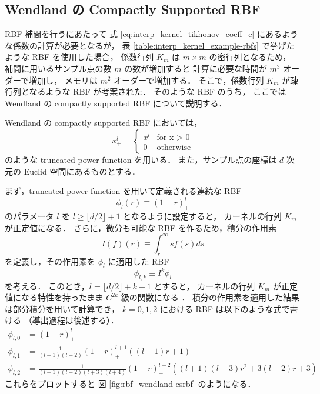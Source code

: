 \subsection{Wendland の Compactly Supported RBF}\label{sec:interp_kernel_csrbf}

RBF 補間を行うにあたって
式 \eqref{eq:interp_kernel_tikhonov_coeff_c} にあるような係数の計算が必要となるが，
表 \ref{table:interp_kernel_example-rbfs}
で挙げたような RBF を使用した場合，
係数行列 $K_m$ は $m \times m$ の密行列となるため，
補間に用いるサンプル点の数 $m$ の数が増加すると
計算に必要な時間が $m^3$ オーダーで増加し，
メモリは $m^2$ オーダーで増加する．
そこで，係数行列 $K_m$ が疎行列となるような RBF が考案された．
そのような RBF のうち，
ここでは Wendland の compactly supported RBF \cite{Wendland1995} について説明する．

Wendland の compactly supported RBF においては，
\begin{equation}
    x_+^l = \begin{cases}
        x^l & \text{for x > 0} \\
        0   & \text{otherwise}
    \end{cases}
\end{equation}
のような truncated power function を用いる．
また，サンプル点の座標は $d$ 次元の Euclid 空間にあるものとする．

まず，truncated power function を用いて定義される連続な RBF
\begin{equation}
    \phi_l(r) \equiv (1 - r)_+^l
\end{equation}
のパラメータ $l$ を $l \ge \lfloor d/2 \rfloor + 1$ となるように設定すると，
カーネルの行列 $K_m$ が正定値になる．
さらに，微分も可能な RBF を作るため，積分の作用素
\begin{equation}
    I(f)(r) \equiv \int_r^\infty sf(s) ds
\end{equation}
を定義し，その作用素を $\phi_l$ に適用した RBF
\begin{equation}
    \phi_{l,k} \equiv I^k \phi_l \label{eq:rbf_wendland-csrbf_definition}
\end{equation}
を考える．
このとき，$l = \lfloor d/2 \rfloor + k + 1$ とすると，
カーネルの行列 $K_m$ が正定値になる特性を持ったまま
$C^{2k}$ 級の関数になる \cite[Theorem 3.5]{Wendland1995}．
積分の作用素を適用した結果は部分積分を用いて計算でき，
$k = 0, 1, 2$ における RBF は以下のような式で書ける
（導出過程は後述する）．
\begin{align}
    \phi_{l,0} & = (1 - r)_+^l
    \label{eq:rbf_wendland-csrbf_formula0}                                        \\
    \phi_{l,1} & = \frac{1}{(l+1)(l+2)} (1 - r)_+^{l+1} \left( (l+1)r + 1 \right)
    \label{eq:rbf_wendland-csrbf_formula1}                                        \\
    \phi_{l,2} & = \frac{1}{(l+1)(l+2)(l+3)(l+4)} (1 - r)_+^{l+2}
    \left( (l+1)(l+3)r^2 + 3(l+2)r + 3 \right)
    \label{eq:rbf_wendland-csrbf_formula2}
\end{align}
これらをプロットすると
図 \ref{fig:rbf_wendland-csrbf}
のようになる．

